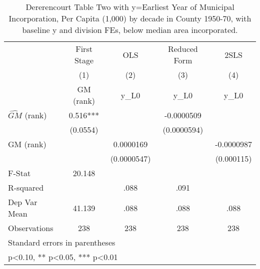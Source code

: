 \begin{table}[htbp]\centering
\def\sym#1{\ifmmode^{#1}\else\(^{#1}\)\fi}
\caption{Dererencourt Table Two with y=Earliest Year of Municipal Incorporation, Per Capita (1,000) by decade in County 1950-70, with baseline y and division FEs, below median area incorporated.}
\begin{tabular}{l*{4}{c}}
\toprule
                    & First Stage   &         OLS   &Reduced Form   &        2SLS   \\
                    &\multicolumn{1}{c}{(1)}&\multicolumn{1}{c}{(2)}&\multicolumn{1}{c}{(3)}&\multicolumn{1}{c}{(4)}\\
                    &\multicolumn{1}{c}{GM  (rank)}&\multicolumn{1}{c}{y\_L0}&\multicolumn{1}{c}{y\_L0}&\multicolumn{1}{c}{y\_L0}\\
\midrule
$\hat{GM}$ (rank)   &       0.516***&               &  -0.0000509   &               \\
                    &    (0.0554)   &               & (0.0000594)   &               \\
\addlinespace
GM  (rank)          &               &   0.0000169   &               &  -0.0000987   \\
                    &               & (0.0000547)   &               &  (0.000115)   \\
\midrule
F-Stat              &      20.148   &               &               &               \\
R-squared           &               &        .088   &        .091   &               \\
Dep Var Mean        &      41.139   &        .088   &        .088   &        .088   \\
Observations        &         238   &         238   &         238   &         238   \\
\bottomrule
\multicolumn{5}{l}{\footnotesize Standard errors in parentheses}\\
\multicolumn{5}{l}{\footnotesize * p<0.10, ** p<0.05, *** p<0.01}\\
\end{tabular}
\end{table}
